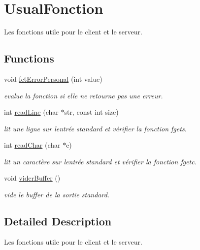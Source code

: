 \hypertarget{group__usual_fct}{}\section{Usual\+Fonction}
\label{group__usual_fct}


Les fonctions utile pour le client et le serveur.  


\subsection*{Functions}
\begin{DoxyCompactItemize}
\item 
void \hyperlink{group__usual_fct_ga33dbce8999f84c76a2425369bbddc9f5}{fct\+Error\+Personal} (int value)
\begin{DoxyCompactList}\small\item\em evalue la fonction si elle ne retourne pas une erreur. \end{DoxyCompactList}\item 
int \hyperlink{group__usual_fct_gaccaaebf00419eb1f7b110e211d25b837}{read\+Line} (char $\ast$str, const int size)
\begin{DoxyCompactList}\small\item\em lit une ligne sur l\textquotesingle{}entrée standard et vérifier la fonction fgets. \end{DoxyCompactList}\item 
int \hyperlink{group__usual_fct_gab027a4fba3a8e8592e72df57d370b7be}{read\+Char} (char $\ast$c)
\begin{DoxyCompactList}\small\item\em lit un caractère sur l\textquotesingle{}entrée standard et vérifier la fonction fgetc. \end{DoxyCompactList}\item 
\hypertarget{group__usual_fct_ga294587294111bfede1e11bdf876b6d10}{}void \hyperlink{group__usual_fct_ga294587294111bfede1e11bdf876b6d10}{vider\+Buffer} ()\label{group__usual_fct_ga294587294111bfede1e11bdf876b6d10}

\begin{DoxyCompactList}\small\item\em vide le buffer de la sortie standard. \end{DoxyCompactList}\end{DoxyCompactItemize}


\subsection{Detailed Description}
Les fonctions utile pour le client et le serveur. 



